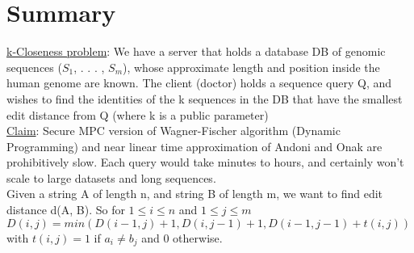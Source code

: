 
\clearpage
{}

%
\setcounter{section}{0} %

\section{Summary}
\underline{k-Closeness problem}: We have a server that holds a database DB of genomic sequences ($S_1$, . . . , $S_m$), whose approximate length and position inside the human genome are known. The client (doctor) holds a sequence query Q, and wishes to find the identities of the k sequences in the DB that have the smallest edit distance from Q (where k is a public parameter) \\

\underline{Claim}: Secure MPC version of Wagner-Fischer algorithm (Dynamic Programming) and near linear time approximation of Andoni and Onak are prohibitively slow. Each query would take minutes to hours, and certainly won't scale to large datasets and long sequences. \\

Given a string A of length n, and string B of length m, we want to find edit distance d(A, B). So for $1 \le i \le n$ and $1 \le j \le m$ \\

$D(i, j) = min ( D(i-1, j) + 1, D(i, j-1) + 1, D(i-1, j-1) + t(i, j))$ \\

with $t(i, j) = 1$ if $a_i \neq b_j$ and $0$ otherwise.\\


